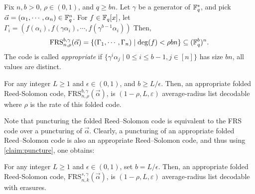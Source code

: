 \begin{definition}
Fix $n,b >0$, $\rho \in (0,1)$, and $q \geq bn$. Let $\gamma$ be a generator of ${\mathbb F}_q^*$, and pick $\vec{\alpha} = (\alpha_1,\cdots, \alpha_n) \in {\mathbb F}_q^n$. For $f \in {\mathbb F}_q[x]$, let $\Gamma_i = (f(\alpha_i), f(\gamma\alpha_i), \cdots, f(\gamma^{b-1}\alpha_i))$
Then,
\[
\mathrm{FRS}^{b,\gamma}_{n,\rho}(\vec{\alpha}) = \lbrace(\Gamma_1, \cdots, \Gamma_n) \mid \deg(f) < \rho b n\rbrace \subseteq ({\mathbb F}_q^{b})^n.
\]	
The code is called \textit{appropriate} if $\{ \gamma^i\alpha_j \mid 0\leq i \leq b-1, j \in [n] \}$ has size $bn$, \ie all values are distinct.
\end{definition}

\begin{theorem}[{\cite[Thm. 1.3]{CZ24}}]
For any integer $L \geq 1$ and $\epsilon \in (0,1)$, and $b \geq L/\epsilon$. Then, an appropriate folded Reed-Solomon code, $\mathrm{FRS}^{b,\gamma}_{n,\rho}(\vec{\alpha})$, is $(1- \rho,L,\varepsilon)$ average-radius list decodable where $\rho$ is the rate of this folded code.
 \end{theorem}

Note that puncturing the folded Reed--Solomon code is equivalent to the FRS code over a puncturing of $\vec{\alpha}$. Clearly, a puncturing of an appropriate folded Reed--Solomon code is also an appropriate Reed--Solomon code, and thus using \cref{claim:puncture}, one obtains:  

\begin{corollary}
	For any integer $L \geq 1$ and $\epsilon \in (0,1)$, set $b = L/\epsilon$. Then, an appropriate folded Reed-Solomon code, $\mathrm{FRS}^{s,\gamma}_{n,k}(\vec{\alpha})$, is $(1- \rho,L,\varepsilon)$ average-radius list decodable with erasures.
\end{corollary}






